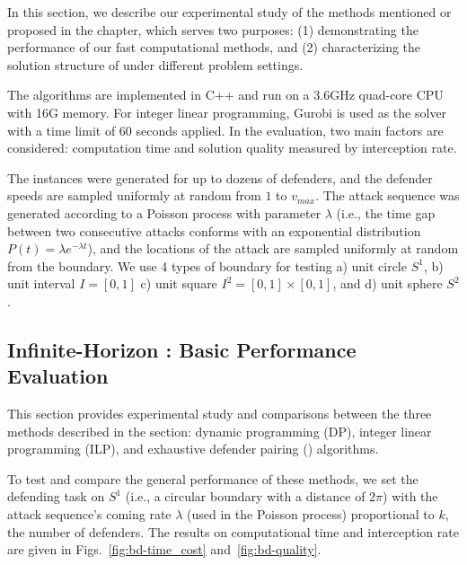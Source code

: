 In this section, we describe our experimental study of the methods mentioned or proposed in the chapter, which serves two purposes: (1) demonstrating the performance of our fast computational methods, and (2) characterizing the solution structure of \prob under different problem settings.
%

The algorithms are implemented in C++ and run on a 3.6GHz quad-core CPU with 16G memory.
For integer linear programming, Gurobi \cite{optimization2019gurobi} is used as the solver with a time limit of 60 seconds applied.
In the evaluation, two main factors are considered: computation time and solution quality measured by interception rate. 

The instances were generated for up to dozens of defenders, 
and the defender speeds are sampled uniformly at random from $1$ to $v_{max}$.
The attack sequence was generated according to a Poisson process with parameter $\lambda$ (i.e., the time gap between
two consecutive attacks conforms with an exponential distribution $P(t) = \lambda e^{-\lambda t}$),
and the locations of the attack are sampled uniformly at random from the boundary.
We use 4 types of boundary for testing a) unit circle $S^1$, b) unit interval $I=[0, 1]$
c) unit square $I^2=[0, 1]\times[0,1]$, and d) unit sphere $S^2$.

\subsection{Infinite-Horizon \prob: Basic Performance Evaluation}
This section provides experimental study and comparisons between the three methods described in the section: 
dynamic programming (DP), integer linear programming (ILP), and exhaustive defender pairing (\ours) algorithms.

To test and compare the general performance of these methods, we set the defending task on $S^1$ (i.e., a circular boundary with a distance of $2\pi$) 
with the attack sequence's coming rate $\lambda$ (used in the Poisson process) proportional to $k$, the number of defenders. 
The results on computational time and interception rate are given in Figs.~\ref{fig:bd-time_cost} and~\ref{fig:bd-quality}.

